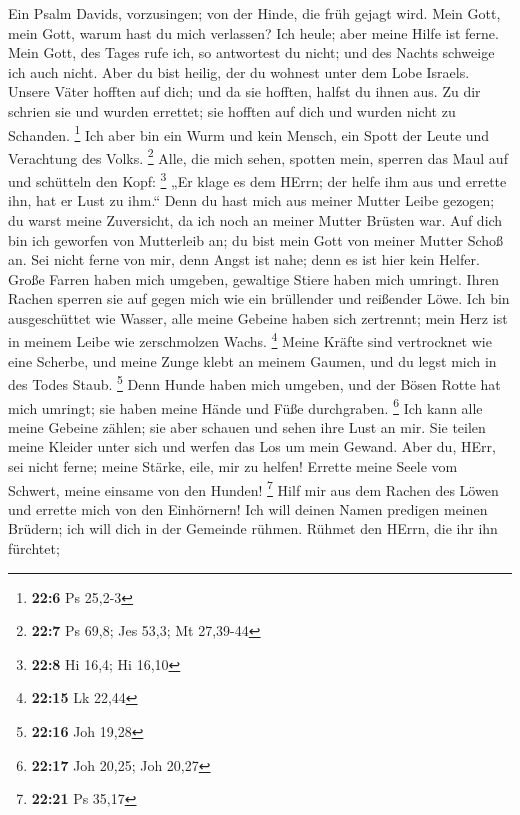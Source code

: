  Ein Psalm Davids, vorzusingen; von der Hinde, die früh
gejagt wird.  Mein Gott, mein Gott, warum hast du mich
verlassen? Ich heule; aber meine Hilfe ist ferne.  Mein
Gott, des Tages rufe ich, so antwortest du nicht; und des Nachts
schweige ich auch nicht.  Aber du bist heilig, der du
wohnest unter dem Lobe Israels.  Unsere Väter hofften auf
dich; und da sie hofften, halfst du ihnen aus.  Zu dir
schrien sie und wurden errettet; sie hofften auf dich und wurden nicht
zu Schanden. \footnote{\textbf{22:6} Ps 25,2-3}  Ich aber
bin ein Wurm und kein Mensch, ein Spott der Leute und Verachtung des
Volks. \footnote{\textbf{22:7} Ps 69,8; Jes 53,3; Mt 27,39-44}
 Alle, die mich sehen, spotten mein, sperren das Maul auf
und schütteln den Kopf: \footnote{\textbf{22:8} Hi 16,4; Hi 16,10}
 „Er klage es dem HErrn; der helfe ihm aus und errette
ihn, hat er Lust zu ihm.``  Denn du hast mich aus meiner
Mutter Leibe gezogen; du warst meine Zuversicht, da ich noch an meiner
Mutter Brüsten war.  Auf dich bin ich geworfen von
Mutterleib an; du bist mein Gott von meiner Mutter Schoß an.
 Sei nicht ferne von mir, denn Angst ist nahe; denn es
ist hier kein Helfer.  Große Farren haben mich umgeben,
gewaltige Stiere haben mich umringt.  Ihren Rachen
sperren sie auf gegen mich wie ein brüllender und reißender Löwe.
 Ich bin ausgeschüttet wie Wasser, alle meine Gebeine
haben sich zertrennt; mein Herz ist in meinem Leibe wie zerschmolzen
Wachs. \footnote{\textbf{22:15} Lk 22,44}  Meine Kräfte
sind vertrocknet wie eine Scherbe, und meine Zunge klebt an meinem
Gaumen, und du legst mich in des Todes Staub. \footnote{\textbf{22:16}
  Joh 19,28}  Denn Hunde haben mich umgeben, und der
Bösen Rotte hat mich umringt; sie haben meine Hände und Füße
durchgraben. \footnote{\textbf{22:17} Joh 20,25; Joh 20,27}
 Ich kann alle meine Gebeine zählen; sie aber schauen und
sehen ihre Lust an mir.  Sie teilen meine Kleider unter
sich und werfen das Los um mein Gewand.  Aber du, HErr,
sei nicht ferne; meine Stärke, eile, mir zu helfen! 
Errette meine Seele vom Schwert, meine einsame von den Hunden!
\footnote{\textbf{22:21} Ps 35,17}  Hilf mir aus dem
Rachen des Löwen und errette mich von den Einhörnern! 
Ich will deinen Namen predigen meinen Brüdern; ich will dich in der
Gemeinde rühmen.  Rühmet den HErrn, die ihr ihn fürchtet;
